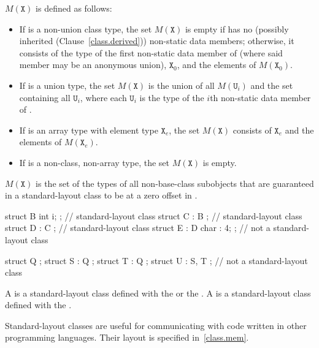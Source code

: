 $M(\mathtt{X})$ is defined as follows:
\begin{itemize}
\item If  is a non-union class type, the set $M(\mathtt{X})$ is
empty if  has no (possibly inherited (Clause~\ref{class.derived}))
non-static data members;
otherwise, it consists of the type of the first non-static data member
of  (where said member may be an anonymous union), $\mathtt{X}_0$,
and the elements of $M(\mathtt{X}_0)$.

\item If  is a union type, the set $M(\mathtt{X})$ is
the union of all $M(\mathtt{U}_i)$ and the set containing all $\mathtt{U}_i$,
where each $\mathtt{U}_i$ is the type of the $i$th non-static data member
of .

\item If  is an array type with element type $\mathtt{X}_e$,
the set $M(\mathtt{X})$ consists of $\mathtt{X}_e$
and the elements of $M(\mathtt{X}_e)$.

\item If  is a non-class, non-array type, the set $M(\mathtt{X})$ is empty.
\end{itemize}

\enternote $M(\mathtt{X})$ is the set of the types of all non-base-class subobjects
that are guaranteed in a standard-layout class to be at a zero offset
in . \exitnote

\enterexample
\begin{codeblock}
   struct B { int i; };         // standard-layout class
   struct C : B { };            // standard-layout class
   struct D : C { };            // standard-layout class
   struct E : D { char : 4; };  // not a standard-layout class

   struct Q {};
   struct S : Q { };
   struct T : Q { };
   struct U : S, T { };         // not a standard-layout class
\end{codeblock}
\exitexample

%
%
%
%
\pnum
A  is a standard-layout class
defined with the   or the
 .
A  is a standard-layout class
defined with the
 .

\pnum
\enternote Standard-layout classes are useful for communicating with
code written in other programming languages. Their layout is specified
in~\ref{class.mem}.\exitnote


